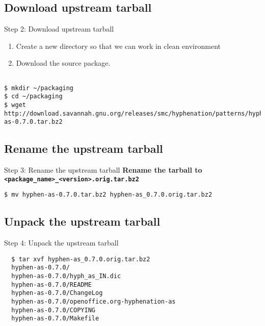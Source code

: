\documentclass[red,10pt,a4paper]{beamer}
\begin{document}
\subsection{Download upstream tarball}

\begin{frame}[fragile]{Step 2: Download upstream tarball}
\lstset{breaklines=true}

\begin{enumerate}
 \item Create a new directory so that we can work in clean environment
 \item Download the source package.
\end{enumerate}

\begin{lstlisting}

$ mkdir ~/packaging
$ cd ~/packaging
$ wget http://download.savannah.gnu.org/releases/smc/hyphenation/patterns/hyphen-as-0.7.0.tar.bz2
    \end{lstlisting} 
\end{frame}

\subsection{Rename the upstream tarball}

\begin{frame}[fragile]{Step 3: Rename the upstream tarball}
\textbf{Rename the tarball to \texttt{<package\_name>\_<version>.orig.tar.bz2}}

\begin{lstlisting}[breaklines=true]
$ mv hyphen-as-0.7.0.tar.bz2 hyphen-as_0.7.0.orig.tar.bz2
\end{lstlisting}

\end{frame}

\subsection{Unpack the upstream tarball}

\begin{frame}[fragile]{Step 4: Unpack the upstream tarball}
 \begin{lstlisting}
  $ tar xvf hyphen-as_0.7.0.orig.tar.bz2 
  hyphen-as-0.7.0/
  hyphen-as-0.7.0/hyph_as_IN.dic
  hyphen-as-0.7.0/README
  hyphen-as-0.7.0/ChangeLog
  hyphen-as-0.7.0/openoffice.org-hyphenation-as
  hyphen-as-0.7.0/COPYING
  hyphen-as-0.7.0/Makefile

 \end{lstlisting}

\end{frame}
\end{document}
